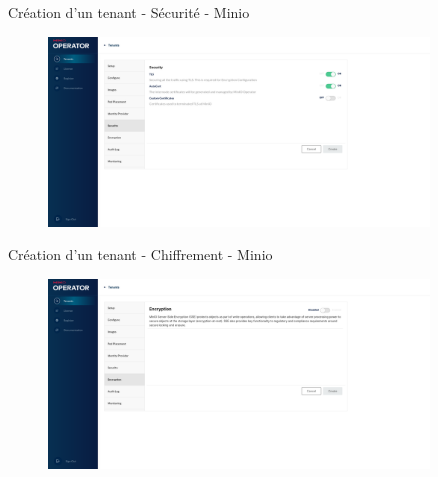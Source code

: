 
\begin{frame}[fragile]{Création d'un tenant - Sécurité - Minio}

\begin{figure}
\begin{center}
\includegraphics[angle=0, width=0.9\textwidth, height=0.9\textheight]{images/security_minio.eps}
\end{center}
\end{figure}

\end{frame}


\begin{frame}[fragile]{Création d'un tenant - Chiffrement - Minio}

\begin{figure}
\begin{center}
\includegraphics[angle=0, width=0.9\textwidth, height=0.9\textheight]{images/encryption_minio.eps}
\end{center}
\end{figure}

\end{frame}

